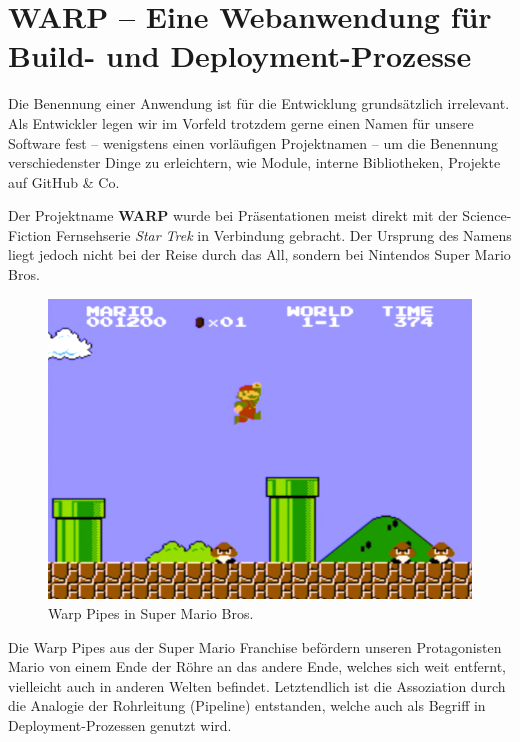 
\chapter{WARP – Eine Webanwendung für Build- und Deployment-Prozesse}

Die Benennung einer Anwendung ist für die Entwicklung grundsätzlich irrelevant. Als Entwickler legen wir im Vorfeld trotzdem gerne einen Namen für unsere Software fest – wenigstens einen vorläufigen Projektnamen – um die Benennung verschiedenster Dinge zu erleichtern, wie Module, interne Bibliotheken, Projekte auf GitHub \& Co.

Der Projektname \textbf{WARP} wurde bei Präsentationen meist direkt mit der Science-Fiction Fernsehserie \emph{Star Trek} in Verbindung gebracht. Der Ursprung des Namens liegt jedoch nicht bei der Reise durch das All, sondern bei Nintendos Super Mario Bros.

\begin{figure}[h]
  \caption{Warp Pipes in Super Mario Bros.}
  \label{fig:super-mario-warp-pipes}
  \centering
    \includegraphics[width=.5\textwidth]{assets/mario-pipes}
\end{figure}

Die Warp Pipes aus der Super Mario Franchise befördern unseren Pro\-ta\-go\-nisten Mario von einem Ende der Röhre an das andere Ende, welches sich weit entfernt, vielleicht auch in anderen Welten befindet. Letztendlich ist die Assoziation durch die Analogie der Rohrleitung (Pipeline) entstanden, welche auch als Begriff in Deployment-Prozessen genutzt wird.

